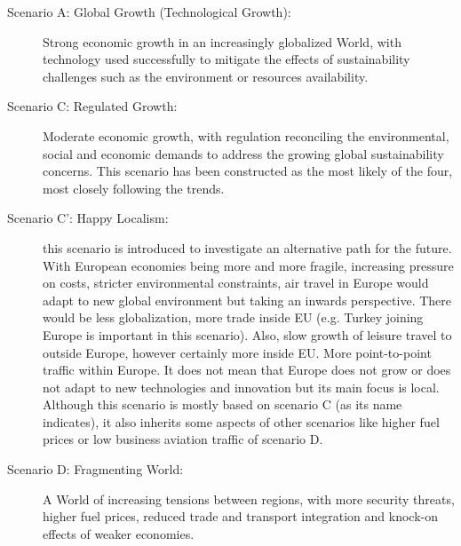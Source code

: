 \begin{description}
\item[Scenario A: Global Growth (Technological Growth):] Strong economic growth in an increasingly globalized World, with technology used successfully to mitigate the effects of sustainability challenges such as the environment or resources availability.
\item[Scenario C: Regulated Growth:] Moderate economic growth, with regulation reconciling the environmental, social and economic demands to address the growing global sustainability concerns. This scenario has been constructed as the most likely of the four, most closely following the trends.
\item[Scenario C’: Happy Localism:] this scenario is introduced to investigate an alternative path for the future. With European economies being more and more fragile, increasing pressure on costs, stricter environmental constraints, air travel in Europe would adapt to new global environment but taking an inwards perspective. There would be less globalization, more trade inside EU (e.g. Turkey joining Europe is important in this scenario). Also, slow growth of leisure travel to outside Europe, however certainly more inside EU. More point-to-point traffic within Europe. It does not mean that Europe does not grow or does not adapt to new technologies and innovation but its main focus is local. Although this scenario is mostly based on scenario C (as its name indicates), it also inherits some aspects of other scenarios like higher fuel prices or low business aviation traffic of scenario D.
\item[Scenario D: Fragmenting World:] A World of increasing tensions between regions, with more security threats, higher fuel prices, reduced trade and transport integration and knock-on effects of weaker economies.
\end{description}

%

